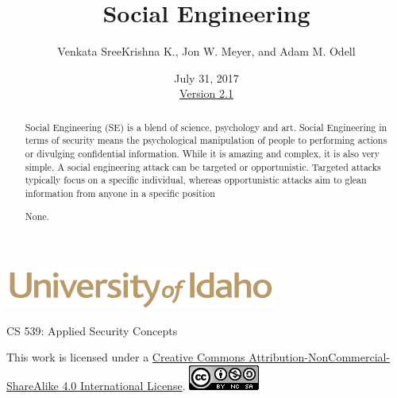 \documentclass[12pt]{extarticle}
\begin{document}
\title{ Social Engineering \\ \large}
\author{Venkata SreeKrishna K., Jon W. Meyer, and Adam M. Odell}
\date{July 31, 2017 \\ \hyperref[changelog]{Version 2.1}} %
\renewcommand{\abstractname}{Executive Summary}
\begin{titlepage}
\maketitle
{}
\begin{center}
\includegraphics[scale=.5]{UofI}

\large{CS 539: Applied Security Concepts}

\vskip 40pt

\end{center}
\begin{abstract}
Social Engineering (SE) is a blend of science, psychology and art. Social Engineering in terms of security means the psychological manipulation of people to performing actions or divulging confidential information. While it is amazing and complex, it is also very simple. A social engineering attack can be targeted or opportunistic. Targeted attacks typically focus on a specific individual, whereas opportunistic attacks aim to glean information from anyone in a specific position


None.
\end{abstract}


\vfill
\begin{center}
This work is licensed under a \href{https://creativecommons.org/licenses/by-nc-sa/4.0/legalcode}{Creative Commons Attribution-NonCommercial-ShareAlike 4.0 International License}.
\vskip 10pt
\includegraphics[scale=.5]{cc}
\end{center}

\end{titlepage}


\pagebreak
\tableofcontents

\end{document}
